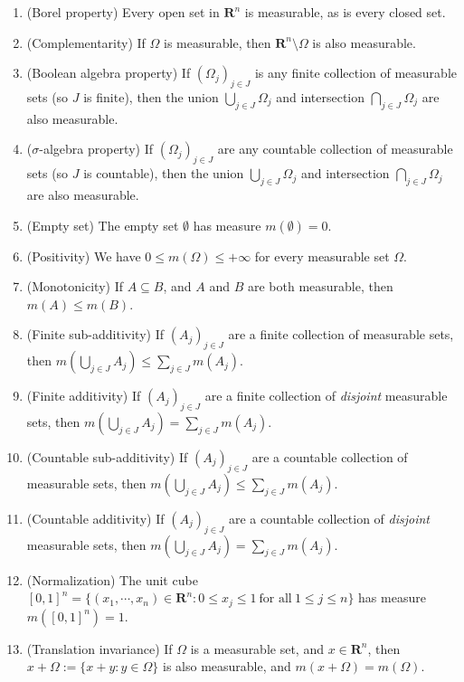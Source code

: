 \documentclass{book}
\begin{document}
\begin{enumerate}[label = (\roman*)]
    \item (Borel property) Every open set in $\mathbf{R}^n$ is measurable, as is every closed set.
    \item (Complementarity) If $\Omega$ is measurable, then $\mathbf{R}^n \setminus \Omega$ is also measurable.
    \item (Boolean algebra property) If $(\Omega_j)_{j \in J}$ is any finite collection of measurable sets (so $J$ is finite), then the union $\bigcup_{j \in J} \Omega_j$ and intersection $\bigcap_{j \in J} \Omega_j$ are also measurable.
    \item ($\sigma$-algebra property) If $(\Omega_j)_{j \in J}$ are any countable collection of measurable sets (so $J$ is countable), then the union $\bigcup_{j \in J} \Omega_j$ and intersection $\bigcap_{j \in J} \Omega_j$ are also measurable.
    \item (Empty set) The empty set $\emptyset$ has measure $m(\emptyset) = 0$.
    \item (Positivity) We have $0 \leq m(\Omega) \leq +\infty$ for every measurable set $\Omega$.
    \item (Monotonicity) If $A \subseteq B$, and $A$ and $B$ are both measurable, then $m(A) \leq m(B)$.
    \item (Finite sub-additivity) If $(A_j)_{j \in J}$ are a finite collection of measurable sets, then $m(\bigcup_{j \in J} A_j) \leq \sum_{j \in J} m(A_j)$.
    \item (Finite additivity) If $(A_j)_{j \in J}$ are a finite collection of \emph{disjoint} measurable sets, then $m(\bigcup_{j \in J} A_j) = \sum_{j \in J} m(A_j)$.
    \item (Countable sub-additivity) If $(A_j)_{j \in J}$ are a countable collection of measurable sets, then $m(\bigcup_{j \in J} A_j) \leq \sum_{j \in J} m(A_j)$.
    \item (Countable additivity) If $(A_j)_{j \in J}$ are a countable collection of \emph{disjoint} measurable sets, then $m(\bigcup_{j \in J} A_j) = \sum_{j \in J} m(A_j)$.
    \item (Normalization) The unit cube $[0,1]^n = \{(x_1, \cdots, x_n) \in \mathbf{R}^n : 0 \leq x_j \leq 1\ \text{for all}\ 1 \leq j \leq n\}$ has measure $m([0,1]^n) = 1$.
    \item (Translation invariance) If $\Omega$ is a measurable set, and $x \in \mathbf{R}^n$, then $x + \Omega := \{x+y : y \in \Omega\}$ is also measurable, and $m(x + \Omega) = m(\Omega)$.
\end{enumerate}
\end{document}
